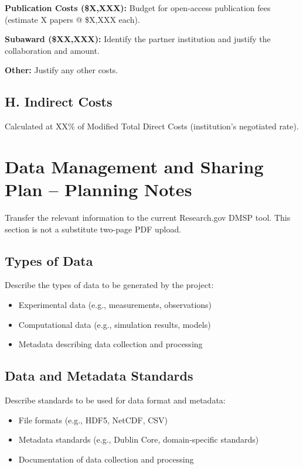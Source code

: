 \documentclass[11pt,letterpaper]{article}
\begin{document}
\textbf{Publication Costs (\$X,XXX):} Budget for open-access publication fees (estimate X papers @ \$X,XXX each).

\textbf{Subaward (\$XX,XXX):} Identify the partner institution and justify the collaboration and amount.

\textbf{Other:} Justify any other costs.

\subsection*{H. Indirect Costs}
Calculated at XX\% of Modified Total Direct Costs (institution's negotiated rate).

\newpage


\section*{Data Management and Sharing Plan -- Planning Notes}
Transfer the relevant information to the current Research.gov DMSP tool. This
section is not a substitute two-page PDF upload.

\subsection*{Types of Data}
Describe the types of data to be generated by the project:
\begin{itemize}
    \item Experimental data (e.g., measurements, observations)
    \item Computational data (e.g., simulation results, models)
    \item Metadata describing data collection and processing
\end{itemize}

\subsection*{Data and Metadata Standards}
Describe standards to be used for data format and metadata:
\begin{itemize}
    \item File formats (e.g., HDF5, NetCDF, CSV)
    \item Metadata standards (e.g., Dublin Core, domain-specific standards)
    \item Documentation of data collection and processing
\end{itemize}
\end{document}
